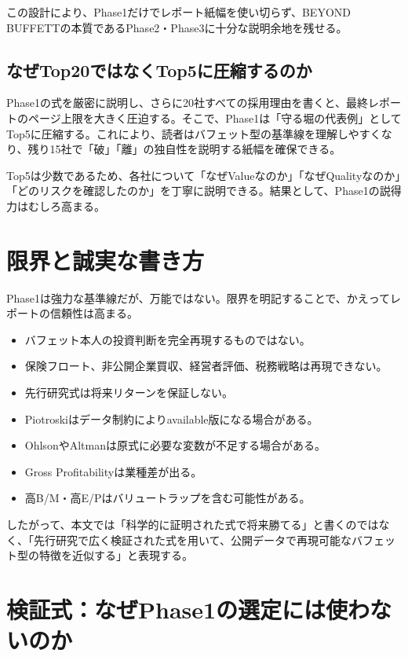 \documentclass[11pt,a4paper]{article}
\begin{document}
この設計により、Phase1だけでレポート紙幅を使い切らず、BEYOND BUFFETTの本質であるPhase2・Phase3に十分な説明余地を残せる。

\subsection{なぜTop20ではなくTop5に圧縮するのか}

Phase1の式を厳密に説明し、さらに20社すべての採用理由を書くと、最終レポートのページ上限を大きく圧迫する。そこで、Phase1は「守る堀の代表例」としてTop5に圧縮する。これにより、読者はバフェット型の基準線を理解しやすくなり、残り15社で「破」「離」の独自性を説明する紙幅を確保できる。

Top5は少数であるため、各社について「なぜValueなのか」「なぜQualityなのか」「どのリスクを確認したのか」を丁寧に説明できる。結果として、Phase1の説得力はむしろ高まる。


\clearpage
\section{限界と誠実な書き方}

Phase1は強力な基準線だが、万能ではない。限界を明記することで、かえってレポートの信頼性は高まる。

\begin{warnbox}
\begin{itemize}[leftmargin=1.5em]
\item バフェット本人の投資判断を完全再現するものではない。
\item 保険フロート、非公開企業買収、経営者評価、税務戦略は再現できない。
\item 先行研究式は将来リターンを保証しない。
\item Piotroskiはデータ制約によりavailable版になる場合がある。
\item OhlsonやAltmanは原式に必要な変数が不足する場合がある。
\item Gross Profitabilityは業種差が出る。
\item 高B/M・高E/Pはバリュートラップを含む可能性がある。
\end{itemize}
\end{warnbox}

したがって、本文では「科学的に証明された式で将来勝てる」と書くのではなく、「先行研究で広く検証された式を用いて、公開データで再現可能なバフェット型の特徴を近似する」と表現する。


\clearpage
\section{検証式：なぜPhase1の選定には使わないのか}
\end{document}
